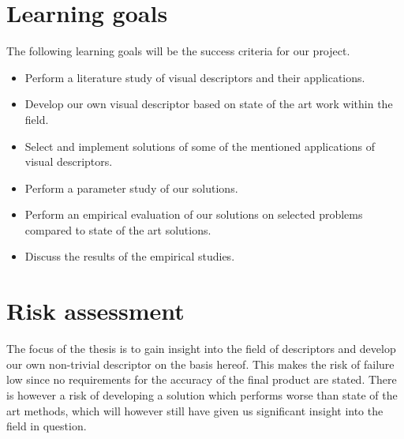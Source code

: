 \documentclass[11pt,a4paper]{article}
\begin{document}
\section{Learning goals}
The following learning goals will be the success criteria for our
project.
\begin{itemize}
    \item Perform a literature study of visual descriptors and their
        applications.
    \item Develop our own visual descriptor based on state of the art work
        within the field.
    \item Select and implement solutions of some of the mentioned applications
        of visual descriptors.
    \item Perform a parameter study of our solutions.
    \item Perform an empirical evaluation of our solutions on selected
        problems compared to state of the art solutions.
    \item Discuss the results of the empirical studies.
\end{itemize}

\section{Risk assessment}
The focus of the thesis is to gain insight into the field of descriptors and
develop our own non-trivial descriptor on the basis hereof. This makes the risk
of failure low since no requirements for the accuracy of the final product are
stated. There is however a risk of developing a solution which performs worse
than state of the art methods, which will however still have given us
significant insight into the field in question.



\end{document}
